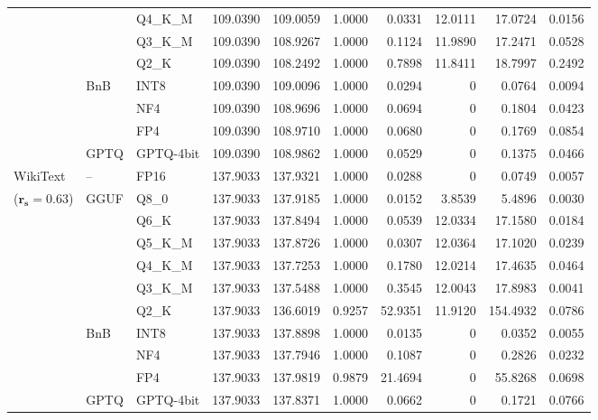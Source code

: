 \begin{longtable}{ll l rrrrrrr}
 &  & Q4\_K\_M & 109.0390 & 109.0059 & 1.0000 & 0.0331 & 12.0111 & 17.0724 & 0.0156 \\
 &  & Q3\_K\_M & 109.0390 & 108.9267 & 1.0000 & 0.1124 & 11.9890 & 17.2471 & 0.0528 \\
 &  & Q2\_K & 109.0390 & 108.2492 & 1.0000 & 0.7898 & 11.8411 & 18.7997 & 0.2492 \\
 & BnB & INT8 & 109.0390 & 109.0096 & 1.0000 & 0.0294 & \cellcolor{cyan!12} $0$ & 0.0764 & 0.0094 \\
 &  & NF4 & 109.0390 & 108.9696 & 1.0000 & 0.0694 & \cellcolor{cyan!12} $0$ & 0.1804 & 0.0423 \\
 &  & FP4 & 109.0390 & 108.9710 & 1.0000 & 0.0680 & \cellcolor{cyan!12} $0$ & 0.1769 & 0.0854 \\
 & GPTQ & GPTQ-4bit & 109.0390 & 108.9862 & 1.0000 & 0.0529 & \cellcolor{cyan!12} $0$ & 0.1375 & 0.0466 \\
\midrule
WikiText & -- & FP16 & 137.9033 & 137.9321 & 1.0000 & 0.0288 & \cellcolor{cyan!12} $0$ & 0.0749 & 0.0057 \\
{\small ($\mathbf{r_s{=}0.63}$)} & GGUF & Q8\_0 & 137.9033 & 137.9185 & 1.0000 & 0.0152 & 3.8539 & 5.4896 & 0.0030 \\
 &  & Q6\_K & 137.9033 & 137.8494 & 1.0000 & 0.0539 & 12.0334 & 17.1580 & 0.0184 \\
 &  & Q5\_K\_M & 137.9033 & 137.8726 & 1.0000 & 0.0307 & 12.0364 & 17.1020 & 0.0239 \\
 &  & Q4\_K\_M & 137.9033 & 137.7253 & 1.0000 & 0.1780 & 12.0214 & 17.4635 & 0.0464 \\
 &  & Q3\_K\_M & 137.9033 & 137.5488 & 1.0000 & 0.3545 & 12.0043 & 17.8983 & 0.0041 \\
 &  & Q2\_K & 137.9033 & 136.6019 & \cellcolor{red!18} 0.9257 & \cellcolor{red!18} 52.9351 & 11.9120 & \cellcolor{red!18} 154.4932 & \cellcolor{red!18} 0.0786 \\
 & BnB & INT8 & 137.9033 & 137.8898 & 1.0000 & 0.0135 & \cellcolor{cyan!12} $0$ & 0.0352 & 0.0055 \\
 &  & NF4 & 137.9033 & 137.7946 & 1.0000 & 0.1087 & \cellcolor{cyan!12} $0$ & 0.2826 & 0.0232 \\
 &  & FP4 & 137.9033 & 137.9819 & 0.9879 & 21.4694 & \cellcolor{cyan!12} $0$ & 55.8268 & 0.0698 \\
 & GPTQ & GPTQ-4bit & 137.9033 & 137.8371 & 1.0000 & 0.0662 & \cellcolor{cyan!12} $0$ & 0.1721 & 0.0766 \\
\end{longtable}
\endgroup